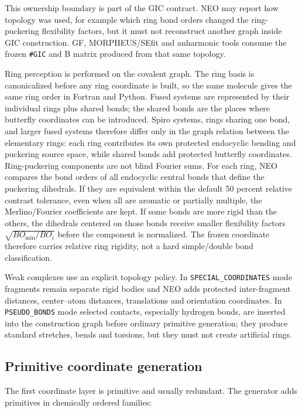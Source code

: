\documentclass[11pt]{article}
\begin{document}
This ownership boundary is part of the GIC contract.  NEO may report how
topology was used, for example which ring bond orders changed the
ring-puckering flexibility factors, but it must not reconstruct another graph
inside GIC construction.  GF, MORPHEUS/SEfit and anharmonic tools consume the
frozen \texttt{\#GIC} and B matrix produced from that same topology.

Ring perception is performed on the covalent graph.  The ring basis is
canonicalized before any ring coordinate is built, so the same molecule gives
the same ring order in Fortran and Python.  Fused systems are represented by
their individual rings plus shared bonds; the shared bonds are the places where
butterfly coordinates can be introduced.  Spiro systems, rings sharing one
bond, and larger fused systems therefore differ only in the graph relation
between the elementary rings: each ring contributes its own protected
endocyclic bending and puckering source space, while shared bonds add protected
butterfly coordinates.  Ring-puckering components are not blind Fourier sums.
For each ring, NEO compares the bond orders of all endocyclic central bonds
that define the puckering dihedrals.  If they are equivalent within the default
50 percent relative contrast tolerance, even when all are aromatic or partially multiple, the Merlino/Fourier
coefficients are kept.  If some bonds are more rigid than the others, the
dihedrals centered on those bonds receive smaller flexibility factors
\(\sqrt{BO_\mathrm{min}/BO_i}\) before the component is normalized.  The frozen
coordinate therefore carries relative ring rigidity, not a hard simple/double
bond classification.

Weak complexes use an explicit topology policy.  In
\texttt{SPECIAL\_COORDINATES} mode fragments remain separate rigid bodies and
NEO adds protected inter-fragment distances, center--atom distances,
translations and orientation coordinates.  In \texttt{PSEUDO\_BONDS} mode
selected contacts, especially hydrogen bonds, are inserted into the construction
graph before ordinary primitive generation; they produce standard stretches,
bends and torsions, but they must not create artificial rings.

\subsection{Primitive coordinate generation}

The first coordinate layer is primitive and usually redundant.  The generator
adds primitives in chemically ordered families:
\end{document}
